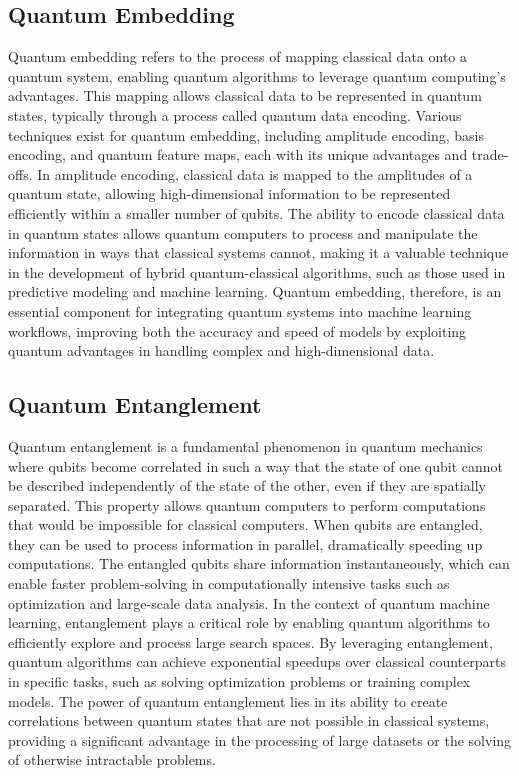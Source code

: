 \documentclass[a4paper]{article}
\begin{document}
\subsection{Quantum Embedding}
Quantum embedding refers to the process of mapping classical data onto a quantum system, enabling quantum algorithms to leverage quantum computing’s advantages. This mapping allows classical data to be represented in quantum states, typically through a process called quantum data encoding. Various techniques exist for quantum embedding, including amplitude encoding, basis encoding, and quantum feature maps, each with its unique advantages and trade-offs. In amplitude encoding, classical data is mapped to the amplitudes of a quantum state, allowing high-dimensional information to be represented efficiently within a smaller number of qubits. The ability to encode classical data in quantum states allows quantum computers to process and manipulate the information in ways that classical systems cannot, making it a valuable technique in the development of hybrid quantum-classical algorithms, such as those used in predictive modeling and machine learning. Quantum embedding, therefore, is an essential component for integrating quantum systems into machine learning workflows, improving both the accuracy and speed of models by exploiting quantum advantages in handling complex and high-dimensional data.

\subsection{Quantum Entanglement}
Quantum entanglement is a fundamental phenomenon in quantum mechanics where qubits become correlated in such a way that the state of one qubit cannot be described independently of the state of the other, even if they are spatially separated. This property allows quantum computers to perform computations that would be impossible for classical computers. When qubits are entangled, they can be used to process information in parallel, dramatically speeding up computations. The entangled qubits share information instantaneously, which can enable faster problem-solving in computationally intensive tasks such as optimization and large-scale data analysis. In the context of quantum machine learning, entanglement plays a critical role by enabling quantum algorithms to efficiently explore and process large search spaces. By leveraging entanglement, quantum algorithms can achieve exponential speedups over classical counterparts in specific tasks, such as solving optimization problems or training complex models. The power of quantum entanglement lies in its ability to create correlations between quantum states that are not possible in classical systems, providing a significant advantage in the processing of large datasets or the solving of otherwise intractable problems.
\end{document}
